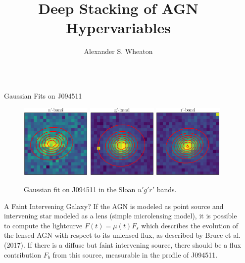 \documentclass[final]{beamer}
\title{Deep Stacking of AGN Hypervariables}
\author{Alexander S. Wheaton \inst{1}}
\institute[shortinst]{\inst{1} The University of Edinburgh}
\newlength{\sepwidth}
\newlength{\colwidth}
\newcommand{\separatorcolumn}{\begin{column}{\sepwidth}\end{column}}
\begin{document}
\begin{frame}[t]
\begin{columns}[t]
\separatorcolumn

\begin{column}{\colwidth}

\begin{block}{\LARGE Gaussian Fits on J094511}
\begin{figure}[t]
    \includegraphics[width=0.32\textwidth]{gauss_fit_wcs_U_stack.eps}
    \includegraphics[width=0.32\textwidth]{gauss_fit_wcs_G_stack.eps}
    \includegraphics[width=0.32\textwidth]{gauss_fit_wcs_R_stack.eps}
    \caption{\Large Gaussian fit on J094511 in the Sloan $u'g'r'$ bands.}
    \label{fig:gauss_fit_wcs_stack}
\end{figure}
\end{block}

\begin{block}{\LARGE A Faint Intervening Galaxy?}
\Large If the AGN is modeled as point source and intervening star modeled as a lens (simple microlensing model), it is possible to compute the lightcurve $F(t) = \mu(t)F_s$ which describes the evolution of the lensed AGN with respect to its unlensed flux, as described by Bruce et al. (2017).\cite{bruce_2017} If there is a diffuse but faint intervening source, there should be a flux contribution $F_b$ from this source, measurable in the profile of J094511.


\end{block}
\end{column}
\end{columns}
\end{frame}
\end{document}
